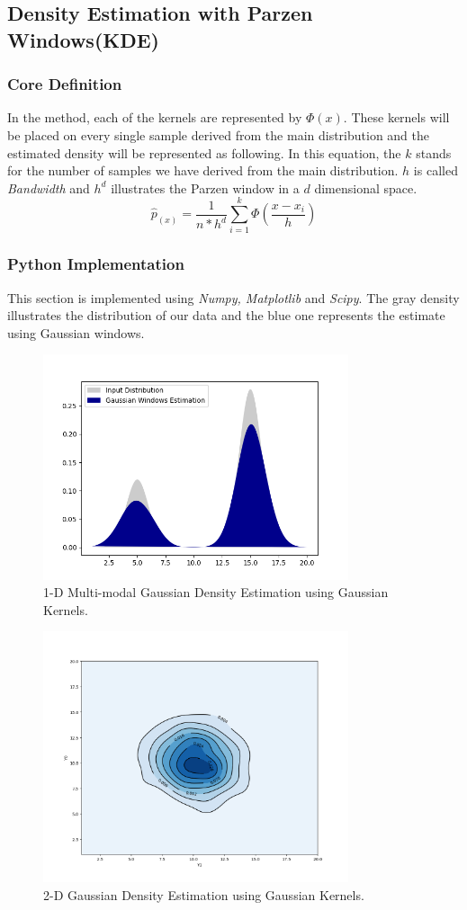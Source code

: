 \documentclass[12pt]{article}
\numberwithin{equation}{section}
\numberwithin{table}{section}
\numberwithin{figure}{section}
\begin{document}
\subsection*{Density Estimation with Parzen Windows(KDE)}
\subsubsection*{Core Definition}
In the method, each of the kernels are represented by $\Phi(x)$. These kernels will be placed on every single sample derived from the main distribution and the estimated density will be represented as following. In this equation, the $k$ stands for the number of samples we have derived from the main distribution. $h$ is called \textit{Bandwidth} and $h^d$ illustrates the Parzen window in a $d$ dimensional space.
\begin{equation}
	\hat{p}_{(x)} = \frac{1}{n*h^d} \sum_{i = 1}^{k}\Phi(\frac{x - x_i}{h})
\end{equation}
\subsubsection*{Python Implementation}
This section is implemented using \textit{Numpy, Matplotlib} and \textit{Scipy}. The gray density illustrates the distribution of our data and the blue one represents the estimate using Gaussian windows.
	\begin{figure}[!h]\centering
	\includegraphics[width=0.8\textwidth]{3_b_1.PNG}
	\caption{1-D Multi-modal Gaussian Density Estimation using Gaussian Kernels.}
	\label{pl1}
\end{figure}

	\begin{figure}[!h]\centering
	\includegraphics[width=0.8\textwidth]{3_b_2.PNG}
	\caption{2-D Gaussian Density Estimation using Gaussian Kernels.}
	\label{pl1}
\end{figure}
\end{document}
